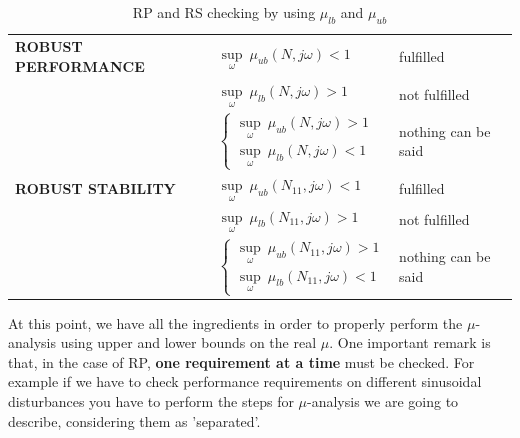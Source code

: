 \documentclass[a4paper, 12pt]{article}
\begin{document}
\begin{table}[h]
    \centering
    \begin{tabular}{p{6cm} p{6cm} p{4cm}}
        \bottomrule[2pt]
        \textbf{ROBUST PERFORMANCE}& $\underset{\omega}{\sup} \ \mu_{ub}(N,j\omega)<1$& \textsf{fulfilled}\\
        & $\underset{\omega}{\sup} \ \mu_{lb}(N,j\omega)>1$ & \textsf{not fulfilled}\\
        & $\begin{cases}
            \underset{\omega}{\sup} \ \mu_{ub}(N,j\omega)>1\\
            \underset{\omega}{\sup} \ \mu_{lb}(N,j\omega)<1
        \end{cases}$ & \textsf{nothing can be said}\\
        \midrule[1pt]
        \textbf{ROBUST STABILITY}& $\underset{\omega}{\sup} \ \mu_{ub}(N_{11},j\omega)<1$&\textsf{fulfilled}\\
        & $\underset{\omega}{\sup} \ \mu_{lb}(N_{11},j\omega)>1$ & \textsf{not fulfilled}\\
        & $\begin{cases}
            \underset{\omega}{\sup} \ \mu_{ub}(N_{11},j\omega)>1\\
            \underset{\omega}{\sup} \ \mu_{lb}(N_{11},j\omega)<1
        \end{cases}$ & \textsf{nothing can be said}\\
        \bottomrule[2pt]
    \end{tabular}
    \caption{RP and RS checking by using $\mu_{lb}$ and $\mu_{ub}$}
    \label{tab:RSRP}
\end{table}

\vspace{-0.3cm}
    \noindent
    \textsf{At this point, we have all the ingredients in order to properly perform the $\mu$-analysis using upper and lower bounds on the real $\mu$. One important remark is that, in the case of RP, \textbf{one requirement at a time} must be checked. For example if we have to check performance requirements on different sinusoidal disturbances you have to perform the steps for $\mu$-analysis we are going to describe, considering them as 'separated'.
    }
\end{document}
